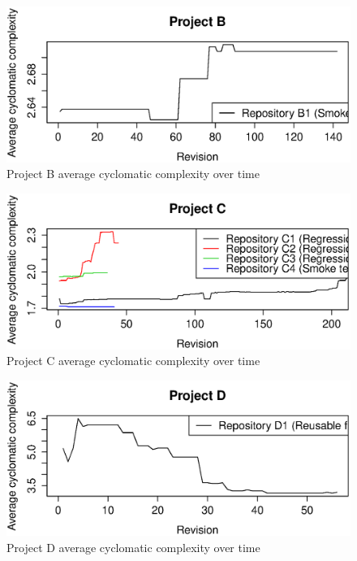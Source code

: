 \begin{figure}[!Htb]
    \centering
    \includegraphics[width=\textwidth,keepaspectratio]{figure/results/rq1/project_b_avg_complexity.eps}
    \caption{Project B average cyclomatic complexity over time}
    \label{fig:project_b_avg_complexity}
\end{figure}

\begin{figure}[!Htb]
    \centering
    \includegraphics[width=\textwidth,keepaspectratio]{figure/results/rq1/project_c_avg_complexity.eps}
    \caption{Project C average cyclomatic complexity over time}
    \label{fig:project_c_avg_complexity}
\end{figure}

\begin{figure}[!Htb]
    \centering
    \includegraphics[width=\textwidth,keepaspectratio]{figure/results/rq1/project_d_avg_complexity.eps}
    \caption{Project D average cyclomatic complexity over time}
    \label{fig:project_d_avg_complexity}
\end{figure}

